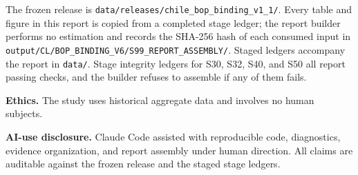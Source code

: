 \documentclass[11pt]{article}
\begin{document}
The frozen release is \texttt{data/releases/chile\_bop\_binding\_v1\_1/}. Every table and figure in this report is copied from a completed stage ledger; the report builder performs no estimation and records the SHA-256 hash of each consumed input in \texttt{output/CL/BOP\_BINDING\_V6/S99\_REPORT\_ASSEMBLY/}. Staged ledgers accompany the report in \texttt{data/}. Stage integrity ledgers for S30, S32, S40, and S50 all report passing checks, and the builder refuses to assemble if any of them fails.

\textbf{Ethics.} The study uses historical aggregate data and involves no human subjects.

\textbf{AI-use disclosure.} Claude Code assisted with reproducible code, diagnostics, evidence organization, and report assembly under human direction. All claims are auditable against the frozen release and the staged stage ledgers.
\end{document}
